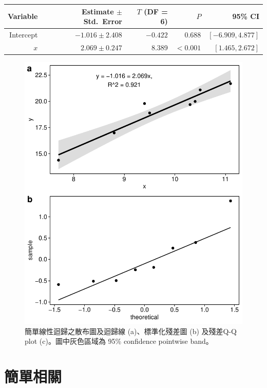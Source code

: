\documentclass[12pt]{article}
\begin{document}
\begin{table}[htbp]
	\centering
	\small
	\begin{tabular}{rrrrr}
		\hline
		Variable & Estimate $\pm$ Std.~Error & $T$ (DF = 6) & $P$ & 95\% CI \\ 
		\hline
		Intercept & $-1.016\pm2.408$ & $-0.422$ & 0.688 & $\left[-6.909, 4.877\right]$ \\ 
		$x$ & $2.069\pm0.247$ & 8.389 & $<0.001$ & $\left[1.465, 2.672\right]$ \\ 
		\hline
	\end{tabular}
	\label{table:simple_regression}
\end{table}

\begin{figure}[htbp]
	\centering
	\includegraphics[]{simple_regression.pdf}
	\caption{簡單線性迴歸之散布圖及迴歸線 (a)、標準化殘差圖 (b) 及殘差Q-Q plot (c)。圖中灰色區域為 95\% confidence pointwise band。}
	\label{fig:simple_regression}
\end{figure}


\section{簡單相關}
\end{document}
